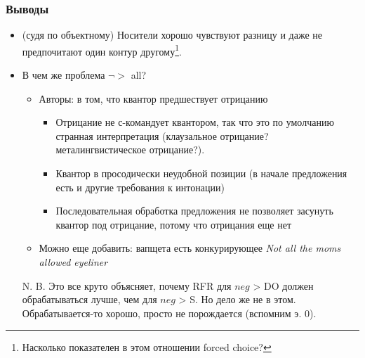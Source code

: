 \documentclass{beamer}
\begin{document}
\begin{frame}
    \frametitle{Выводы}

    \begin{itemize}
        \item (судя по объектному) Носители хорошо чувствуют разницу и даже не предпочитают один контур другому\footnote{Насколько показателен в этом отношении forced choice?}.
        \pause
        \item В чем же проблема $\neg>$ all?
        \begin{itemize}
            \item Авторы: в том, что квантор предшествует отрицанию
            \pause
            \begin{itemize}
                \item Отрицание не с-командует квантором, так что это по умолчанию странная интерпретация (клаузальное отрицание? металингвистическое отрицание?).
                \item Квантор в просодически неудобной позиции (в начале предложения есть и другие требования к интонации)
                \item Последовательная обработка предложения не позволяет засунуть квантор под отрицание, потому что отрицания еще нет
            \end{itemize}
            \item Можно еще добавить: вапщета есть конкурирующее \textit{Not all the moms allowed eyeliner}
        \end{itemize}
        {\small N. B. Это все круто объясняет, почему RFR для $neg$ > DO должен обрабатываться лучше, чем для $neg$ > S. Но дело же не в этом. Обрабатывается-то хорошо, просто не порождается (вспомним э. 0).}
    \end{itemize}
\end{frame}
\end{document}
